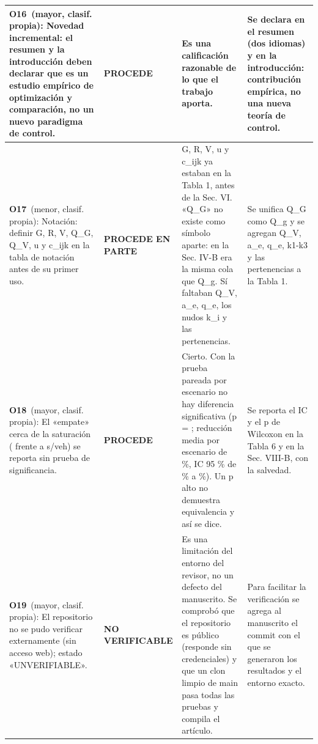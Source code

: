 \begin{longtable}{@{}p{7.4cm}p{2.1cm}p{8.4cm}p{7.3cm}@{}}
\midrule
\textbf{O16}\ (mayor, clasif. propia): Novedad incremental: el resumen y la introducción deben declarar que es un estudio empírico de optimización y comparación, no un nuevo paradigma de control.\par\smallskip{\itshape Ubicaci\'on citada: C2; Scorecard; Sec. 1} & \cellcolor{okverde}\textbf{PROCEDE} & Es una calificación razonable de lo que el trabajo aporta. & Se declara en el resumen (dos idiomas) y en la introducción: contribución empírica, no una nueva teoría de control.\par\smallskip{\itshape Queda en: Sec. I (p. 1)} \\
\midrule
\textbf{O17}\ (menor, clasif. propia): Notación: definir G, R, V, Q\_G, Q\_V, u y c\_ijk en la tabla de notación antes de su primer uso.\par\smallskip{\itshape Ubicaci\'on citada: Sec. 8; Sec. VI} & \cellcolor{okamarillo}\textbf{PROCEDE EN PARTE} & G, R, V, u y c\_ijk ya estaban en la Tabla 1, antes de la Sec. VI. «Q\_G» no existe como símbolo aparte: en la Sec. IV-B era la misma cola que Q\_g. Sí faltaban Q\_V, a\_e, q\_e, los nudos k\_i y las pertenencias. & Se unifica Q\_G como Q\_g y se agregan Q\_V, a\_e, q\_e, k1-k3 y las pertenencias a la Tabla 1.\par\smallskip{\itshape Queda en: Tabla 1 (p. 4); Sec. IV-B (p. 3)} \\
\midrule
\textbf{O18}\ (mayor, clasif. propia): El «empate» cerca de la saturación (\DelaySaFlc{} frente a \DelaySaActAf{} s/veh) se reporta sin prueba de significancia.\par\smallskip{\itshape Ubicaci\'on citada: Sec. 7; Tabla 6; C-tabla de evidencia} & \cellcolor{okverde}\textbf{PROCEDE} & Cierto. Con la prueba pareada por escenario no hay diferencia significativa (p = \EscActAfSaP{}; reducción media por escenario de \EscActAfSaRed{} \%, IC 95 \% de \EscActAfSaLo{} \% a \EscActAfSaHi{} \%). Un p alto no demuestra equivalencia y así se dice. & Se reporta el IC y el p de Wilcoxon en la Tabla 6 y en la Sec. VIII-B, con la salvedad.\par\smallskip{\itshape Queda en: Sec. VIII-B (p. 8); Tabla 6 (p. 11)} \\
\midrule
\textbf{O19}\ (mayor, clasif. propia): El repositorio no se pudo verificar externamente (sin acceso web); estado «UNVERIFIABLE».\par\smallskip{\itshape Ubicaci\'on citada: Etapa 0; C9; Parte 4B ítems 10 y 11} & \cellcolor{okgris}\textbf{NO VERIFICABLE} & Es una limitación del entorno del revisor, no un defecto del manuscrito. Se comprobó que el repositorio es público (responde sin credenciales) y que un clon limpio de main pasa todas las pruebas y compila el artículo. & Para facilitar la verificación se agrega al manuscrito el commit con el que se generaron los resultados y el entorno exacto.\par\smallskip{\itshape Queda en: «Disponibilidad del código» (p. 10)} \\

\end{longtable}
